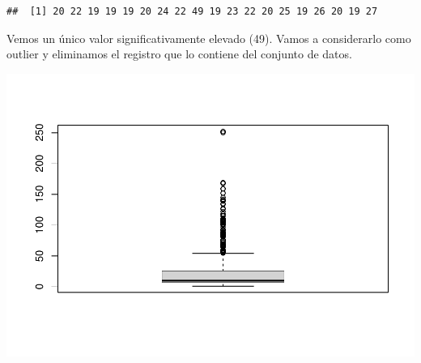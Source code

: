 \documentclass[
]{article}
\newenvironment{Shaded}{\begin{snugshade}}{\end{snugshade}}
\newcommand{\DecValTok}[1]{\textcolor[rgb]{0.00,0.00,0.81}{#1}}
\newcommand{\KeywordTok}[1]{\textcolor[rgb]{0.13,0.29,0.53}{\textbf{#1}}}
\newcommand{\NormalTok}[1]{#1}
\newcommand{\OperatorTok}[1]{\textcolor[rgb]{0.81,0.36,0.00}{\textbf{#1}}}
\newcommand{\StringTok}[1]{\textcolor[rgb]{0.31,0.60,0.02}{#1}}
\begin{document}
\begin{Shaded}
\end{Shaded}

\begin{verbatim}
##  [1] 20 22 19 19 19 20 24 22 49 19 23 22 20 25 19 26 20 19 27
\end{verbatim}

Vemos un único valor significativamente elevado (49). Vamos a
considerarlo como outlier y eliminamos el registro que lo contiene del
conjunto de datos.

\begin{Shaded}
\end{Shaded}

\begin{Shaded}
\end{Shaded}

\includegraphics{PRAC2_Limpieza_Analisis_Datos---Sales_files/figure-latex/unnamed-chunk-17-1.pdf}
\end{document}
